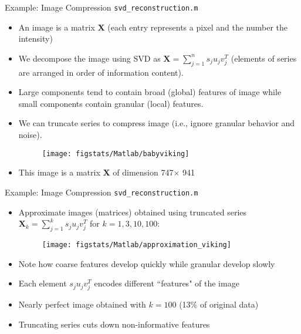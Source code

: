 \documentclass[9pt]{beamer}
\begin{document}
\begin{frame}{Example: Image Compression \footnotesize{\texttt{svd\_reconstruction.m}}}

\begin{itemize}
\setlength{\itemsep}{5pt}
\item An image is a matrix $\mathbf{X}$ (each entry represents a pixel and the number the intensity)
\item We decompose the image using SVD as $\mathbf{X}=\sum_{j=1}^ns_ju_jv_j^T$ (elements of series are arranged in order of information content). 
\item Large components tend to contain broad (global) features of image while small components contain granular (local) features. 
\item We can truncate series to compress image (i.e., ignore granular behavior and noise).


\begin{figure}[!htb]
    \centering
	\texttt{[image: figstats/Matlab/babyviking]}
\end{figure}

\item This image is a matrix $\mathbf{X}$ of dimension 747$\times$ 941
\end{itemize}

\end{frame}


\begin{frame}{Example: Image Compression \footnotesize{\texttt{svd\_reconstruction.m}}}

\begin{itemize}
\item Approximate images (matrices) obtained using truncated series $\mathbf{X}_k=\sum_{j=1}^ks_ju_jv_j^T$ for $k=1,3,10,100$:


\begin{figure}[!htb]
    \centering
	\texttt{[image: figstats/Matlab/approximation\_viking]}
\end{figure}

\item Note how coarse features develop quickly while granular develop slowly
\item Each element $s_ju_jv_j^T$ encodes different ``features" of the image
\item Nearly perfect image obtained with $k=100$ (13\% of original data)
\item Truncating series cuts down non-informative features
\end{itemize}
\end{frame}
\end{document}

